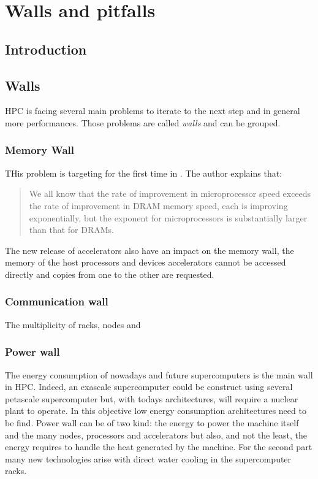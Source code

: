 
\chapter{Walls and pitfalls}

\section{Introduction}

\section{Walls}

HPC is facing several main problems to iterate to the next step and in general more performances. 
Those problems are called \textit{walls} and can be grouped. 

\subsection{Memory Wall}
THis problem is targeting for the first time in \cite{wulf1995hitting}.
The author explains that:

\begin{quotation} We all know that the rate of improvement in microprocessor speed exceeds the rate of
improvement in DRAM memory speed, each is improving exponentially, but the
exponent for microprocessors is substantially larger than that for DRAMs.
\end{quotation} 

The new release of accelerators also have an impact on the memory wall, the memory of the host processors and devices accelerators cannot be accessed directly and copies from one to the other are requested.

\subsection{Communication wall} 
The multiplicity of racks, nodes and 

\subsection{Power wall}
The energy consumption of nowadays and future supercomputers is the main wall in HPC. 
Indeed, an exascale supercomputer could be construct using several petascale supercomputer but, with todays architectures, will require a nuclear plant to operate. 
In this objective low energy consumption architectures need to be find. 
Power wall can be of two kind: the energy to power the machine itself and the many nodes, processors and accelerators but also, and not the least, the energy requires to handle the heat generated by the machine. 
For the second part many new technologies arise with direct water cooling in the supercomputer racks.

